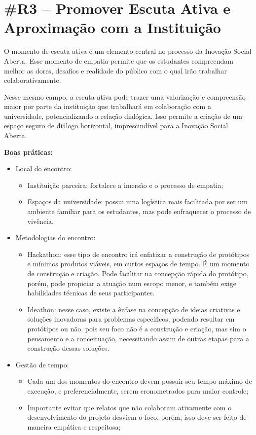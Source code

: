 \section*{\#R3 – Promover Escuta Ativa e Aproximação com a Instituição}

O momento de escuta ativa é um elemento central no processo da Inovação Social Aberta. Esse momento de empatia permite que os estudantes compreendam melhor as dores, desafios e realidade do público com o qual irão trabalhar colaborativamente.

Nesse mesmo campo, a escuta ativa pode trazer uma valorização e compreensão maior por parte da instituição que trabalhará em colaboração com a universidade, potencializando a relação dialógica. Isso permite a criação de um espaço seguro de diálogo horizontal, imprescindível para a Inovação Social Aberta.

\textbf{Boas práticas:}
\begin{itemize}
    \item Local do encontro:
    \begin{itemize}
            \item Instituição parceira: fortalece a imersão e o processo de empatia;
            \item Espaços da universidade: possui uma logística mais facilitada por ser um ambiente familiar para os estudantes, mas pode enfraquecer o processo de vivência.
    \end{itemize}

    \item Metodologias do encontro:
    \begin{itemize}
            \item Hackathon: esse tipo de encontro irá enfatizar a construção de protótipos e mínimos produtos viáveis, em curtos espaços de tempo. É um momento de construção e criação. Pode facilitar na concepção rápida do protótipo, porém, pode propiciar a atuação num escopo menor, e também exige habilidades técnicas de seus participantes.
            \item Ideathon: nesse caso, existe a ênfase na concepção de ideias criativas e soluções inovadoras para problemas específicos, podendo resultar em protótipos ou não, pois seu foco não é a construção e criação, mas sim o pensamento e a conceituação, necessitando assim de outras etapas para a construção dessas soluções.
    \end{itemize}

    \item Gestão de tempo:
    \begin{itemize}
            \item Cada um dos momentos do encontro devem possuir seu tempo máximo de execução, e preferencialmente, serem cronometrados para maior controle;
            \item Importante evitar que relatos que não colaboram ativamente com o desenvolvimento do projeto desviem o foco, porém, isso deve ser feito de maneira empática e respeitosa;
    \end{itemize}
\end{itemize}

